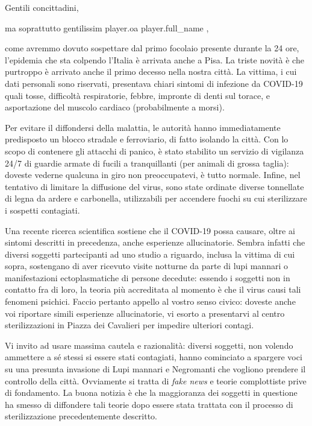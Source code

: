 \documentclass{letter}
\date{1 marzo 2020}
\begin{document}
\begin{letter}{}
\opening{Gentili concittadini,}

ma soprattutto gentilissim{{ player.oa }} {{ player.full_name }},

come avremmo dovuto sospettare dal primo focolaio presente durante la 24 ore, l'epidemia che sta colpendo l'Italia è arrivata anche a Pisa. La triste novità è che purtroppo è arrivato anche il primo decesso nella nostra città. La vittima, i cui dati personali sono riservati, presentava chiari sintomi di infezione da COVID-19 quali tosse, difficoltà respiratorie, febbre, impronte di denti sul torace, e asportazione del muscolo cardiaco (probabilmente a morsi).

Per evitare il diffondersi della malattia, le autorità hanno immediatamente predisposto un blocco stradale e ferroviario, di fatto isolando la città. Con lo scopo di contenere gli attacchi di panico, è stato stabilito un servizio di vigilanza 24/7 di guardie armate di fucili a tranquillanti (per animali di grossa taglia): doveste vederne qualcuna in giro non preoccupatevi, è tutto normale. Infine, nel tentativo di limitare la diffusione del virus, sono state ordinate diverse tonnellate di legna da ardere e carbonella, utilizzabili per accendere fuochi su cui sterilizzare i sospetti contagiati.

Una recente ricerca scientifica sostiene che il COVID-19 possa causare, oltre ai sintomi descritti in precedenza, anche esperienze allucinatorie. Sembra infatti che diversi soggetti partecipanti ad uno studio a riguardo, inclusa la vittima di cui sopra, sostengano di aver ricevuto visite notturne da parte di lupi mannari o manifestazioni ectoplasmatiche di persone decedute: essendo i soggetti non in contatto fra di loro, la teoria più accreditata al momento è che il virus causi tali fenomeni psichici. Faccio pertanto appello al vostro senso civico: doveste anche voi riportare simili esperienze allucinatorie, vi esorto a presentarvi al centro sterilizzazioni in Piazza dei Cavalieri per impedire ulteriori contagi.

Vi invito ad usare massima cautela e razionalità: diversi soggetti, non volendo ammettere a sé stessi si essere stati contagiati, hanno cominciato a spargere voci su una presunta invasione di Lupi mannari e Negromanti che vogliono prendere il controllo della città. Ovviamente si tratta di \emph{fake news} e teorie complottiste prive di fondamento. La buona notizia è che la maggioranza dei soggetti in questione ha smesso di diffondere tali teorie dopo essere stata trattata con il processo di sterilizzazione precedentemente descritto.


\end{letter}
\end{document}
